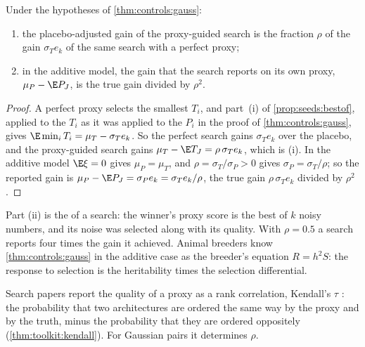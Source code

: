 \begin{refsection}
\begin{corollary}\label{cor:controls:curse}
Under the hypotheses of \cref{thm:controls:gauss}:
\begin{enumerate}
\item the placebo-adjusted gain of the proxy-guided search is the fraction $\rho$ of the gain $\sigma_Te_k$ of the same search with a perfect proxy;
\item in the additive model, the gain that the search reports on its own proxy, $\mu_P-\E P_J$, is the true gain divided by $\rho^2$.
\end{enumerate}
\end{corollary}

\begin{proof}
A perfect proxy selects the smallest $T_i$, and part~(i) of \cref{prop:seeds:bestof}, applied to the $T_i$ as it was applied to the $P_i$ in the proof of \cref{thm:controls:gauss}, gives $\E\min_iT_i=\mu_T-\sigma_Te_k$. So the perfect search gains $\sigma_Te_k$ over the placebo, and the proxy-guided search gains $\mu_T-\E T_J=\rho\,\sigma_Te_k$, which is (i). In the additive model $\E\xi=0$ gives $\mu_P=\mu_T$, and $\rho=\sigma_T/\sigma_P>0$ gives $\sigma_P=\sigma_T/\rho$; so the reported gain is $\mu_P-\E P_J=\sigma_Pe_k=\sigma_Te_k/\rho$, the true gain $\rho\,\sigma_Te_k$ divided by $\rho^2$.
\end{proof}

Part (ii) is the  of a search: the winner's proxy score is the best of $k$ noisy numbers, and its noise was selected along with its quality. With $\rho=0.5$ a search reports four times the gain it achieved. Animal breeders know \cref{thm:controls:gauss} in the additive case as the breeder's equation $R=h^2S$: the response to selection is the heritability times the selection differential.

Search papers report the quality of a proxy as a rank correlation, Kendall's $\tau$ \parencite{Kendall1938}: the probability that two architectures are ordered the same way by the proxy and by the truth, minus the probability that they are ordered oppositely (\cref{thm:toolkit:kendall}). For Gaussian pairs it determines $\rho$.


\end{refsection}
